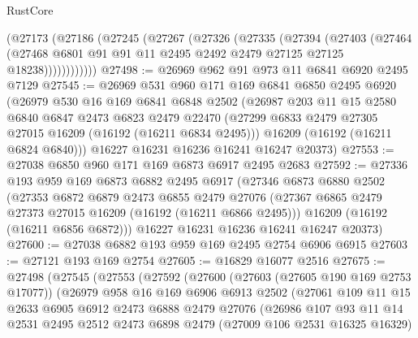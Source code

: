 \begin{lexlean}{RustCore}
\begin{coremodule}
        (@27173
          (@27186
            (@27245
              (@27267
                (@27326
                  (@27335
                    (@27394
                      (@27403
                        (@27464
                          (@27468
                            @6801
                            @91
                            @91
                            @11
                            @2495
                            @2492
                            @2479
                            @27125
                            @27125
                            @18238))))))))))))
@27498 := @26969 @962 @91 @973 @11 @6841 @6920 @2495 @7129
@27545 := @26969
    @531
    @960
    @171
    @169
    @6841
    @6850
    @2495
    @6920
    (@26979
      @530
      @16
      @169
      @6841
      @6848
      @2502
      (@26987
        @203
        @11
        @15
        @2580
        @6840
        @6847
        @2473
        @6823
        @2479
        @22470
        (@27299 @6833 @2479 @27305 @27015 @16209 (@16192 (@16211 @6834 @2495)))
        @16209
        (@16192 (@16211 @6824 @6840)))
      @16227
      @16231
      @16236
      @16241
      @16247
      @20373)
@27553 := @27038 @6850 @960 @171 @169 @6873 @6917 @2495 @2683
@27592 := @27336
    @193
    @959
    @169
    @6873
    @6882
    @2495
    @6917
    (@27346
      @6873
      @6880
      @2502
      (@27353
        @6872
        @6879
        @2473
        @6855
        @2479
        @27076
        (@27367 @6865 @2479 @27373 @27015 @16209 (@16192 (@16211 @6866 @2495)))
        @16209
        (@16192 (@16211 @6856 @6872)))
      @16227
      @16231
      @16236
      @16241
      @16247
      @20373)
@27600 := @27038 @6882 @193 @959 @169 @2495 @2754 @6906 @6915
@27603 := @27121 @193 @169 @2754
@27605 := @16829 @16077 @2516
@27675 := @27498
    (@27545
      (@27553
        (@27592
          (@27600
            (@27603 (@27605 @190 @169 @2753 @17077))
            (@26979
              @958
              @16
              @169
              @6906
              @6913
              @2502
              (@27061
                @109
                @11
                @15
                @2633
                @6905
                @6912
                @2473
                @6888
                @2479
                @27076
                (@26986
                  @107
                  @93
                  @11
                  @14
                  @2531
                  @2495
                  @2512
                  @2473
                  @6898
                  @2479
                  (@27009 @106 @2531 @16325 @16329)

\end{coremodule}
\end{lexlean}
